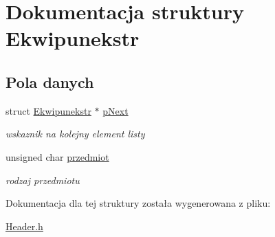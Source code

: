 \hypertarget{struct_ekwipunekstr}{}\section{Dokumentacja struktury Ekwipunekstr}
\label{struct_ekwipunekstr}
\subsection*{Pola danych}
\begin{DoxyCompactItemize}
\item 
\mbox{\label{struct_ekwipunekstr_ab1094467b0ef4bf119f607c3d88f4406}} 
struct \mbox{\hyperlink{struct_ekwipunekstr}{Ekwipunekstr}} $\ast$ \mbox{\hyperlink{struct_ekwipunekstr_ab1094467b0ef4bf119f607c3d88f4406}{p\+Next}}
\begin{DoxyCompactList}\small\item\em wskaznik na kolejny element listy \end{DoxyCompactList}\item 
\mbox{\label{struct_ekwipunekstr_a6669d42198769a00615040125e4aa9ab}} 
unsigned char \mbox{\hyperlink{struct_ekwipunekstr_a6669d42198769a00615040125e4aa9ab}{przedmiot}}
\begin{DoxyCompactList}\small\item\em rodzaj przedmiotu \end{DoxyCompactList}\end{DoxyCompactItemize}


Dokumentacja dla tej struktury została wygenerowana z pliku\+:\begin{DoxyCompactItemize}
\item 
\mbox{\hyperlink{_header_8h}{Header.\+h}}\end{DoxyCompactItemize}
